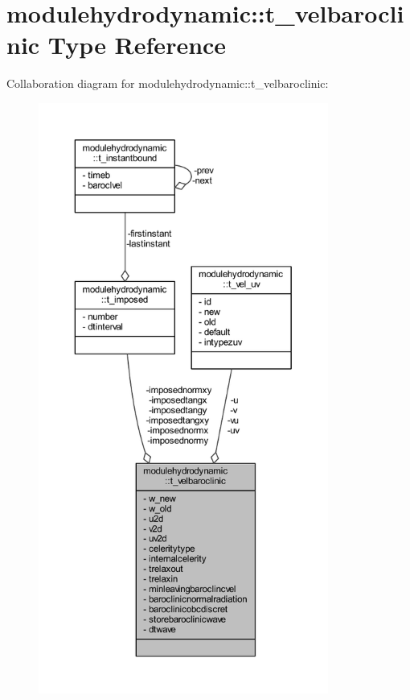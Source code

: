 \hypertarget{structmodulehydrodynamic_1_1t__velbaroclinic}{}\section{modulehydrodynamic\+:\+:t\+\_\+velbaroclinic Type Reference}
\label{structmodulehydrodynamic_1_1t__velbaroclinic}


Collaboration diagram for modulehydrodynamic\+:\+:t\+\_\+velbaroclinic\+:\nopagebreak
\begin{figure}[H]
\begin{center}
\leavevmode
\includegraphics[height=550pt]{structmodulehydrodynamic_1_1t__velbaroclinic__coll__graph}
\end{center}
\end{figure}

